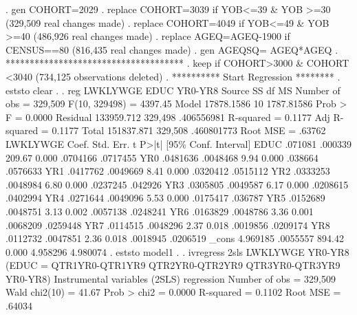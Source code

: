 . gen COHORT=2029
{\smallskip}
. replace COHORT=3039 if YOB<=39 \& YOB >=30
(329,509 real changes made)
{\smallskip}
. replace COHORT=4049 if YOB<=49 \& YOB >=40
(486,926 real changes made)
{\smallskip}
. replace AGEQ=AGEQ-1900 if CENSUS==80
(816,435 real changes made)
{\smallskip}
. gen AGEQSQ= AGEQ*AGEQ
{\smallskip}
. *************************************
. keep if COHORT>3000 \& COHORT <3040
(734,125 observations deleted)
{\smallskip}
. **********  Start Regression ********
. eststo clear
{\smallskip}
. 
. reg  LWKLYWGE EDUC  YR0-YR8 
{\smallskip}
      Source {\VBAR}       SS           df       MS      Number of obs   =   329,509
   F(10, 329498)   =   4397.45
       Model {\VBAR}  17878.1586        10  1787.81586   Prob > F        =    0.0000
    Residual {\VBAR}  133959.712   329,498  .406556981   R-squared       =    0.1177
   Adj R-squared   =    0.1177
       Total {\VBAR}  151837.871   329,508  .460801773   Root MSE        =    .63762
{\smallskip}
    LWKLYWGE {\VBAR}      Coef.   Std. Err.      t    P>|t|     [95\% Conf. Interval]
        EDUC {\VBAR}    .071081    .000339   209.67   0.000     .0704166    .0717455
         YR0 {\VBAR}   .0481636   .0048468     9.94   0.000      .038664    .0576633
         YR1 {\VBAR}   .0417762   .0049669     8.41   0.000     .0320412    .0515112
         YR2 {\VBAR}   .0333253   .0048984     6.80   0.000     .0237245     .042926
         YR3 {\VBAR}   .0305805   .0049587     6.17   0.000     .0208615    .0402994
         YR4 {\VBAR}   .0271644   .0049096     5.53   0.000     .0175417     .036787
         YR5 {\VBAR}   .0152689   .0048751     3.13   0.002     .0057138    .0248241
         YR6 {\VBAR}   .0163829   .0048786     3.36   0.001     .0068209    .0259448
         YR7 {\VBAR}   .0114515   .0048296     2.37   0.018     .0019856    .0209174
         YR8 {\VBAR}   .0112732   .0047851     2.36   0.018     .0018945    .0206519
       _cons {\VBAR}   4.969185   .0055557   894.42   0.000     4.958296    4.980074
{\smallskip}
. eststo model1
{\smallskip}
. 
. ivregress 2sls LWKLYWGE YR0-YR8 (EDUC = QTR1YR0-QTR1YR9 QTR2YR0-QTR2YR9 QTR3YR0-QTR3YR9 YR0-YR8)
{\smallskip}
Instrumental variables (2SLS) regression          Number of obs   =    329,509
                                                  Wald chi2(10)   =      41.67
                                                  Prob > chi2     =     0.0000
                                                  R-squared       =     0.1102
                                                  Root MSE        =     .64034
